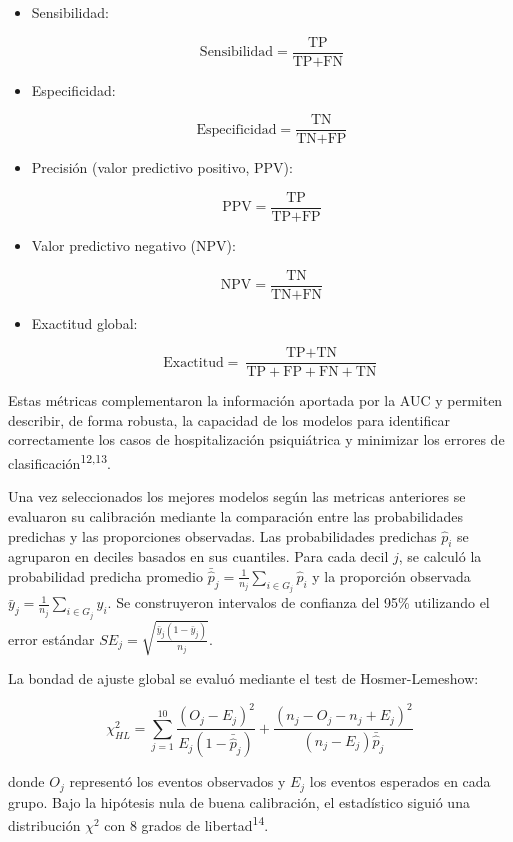 \documentclass[
  spanish,
  10pt,
]{article}
\begin{document}
\begin{itemize}
\item
  Sensibilidad:

  \[
  \text{Sensibilidad} = \frac{\text{TP}}{\text{TP}+\text{FN}}
  \]
\item
  Especificidad:

  \[
  \text{Especificidad} = \frac{\text{TN}}{\text{TN}+\text{FP}}
  \]
\item
  Precisión (valor predictivo positivo, PPV):

  \[
  \text{PPV} = \frac{\text{TP}}{\text{TP}+\text{FP}}
  \]
\item
  Valor predictivo negativo (NPV):

  \[
  \text{NPV} = \frac{\text{TN}}{\text{TN}+\text{FN}}
  \]
\item
  Exactitud global:

  \[
  \text{Exactitud} = \frac{\text{TP}+\text{TN}}{\text{TP}+\text{FP}+\text{FN}+\text{TN}}
  \]
\end{itemize}

Estas métricas complementaron la información aportada por la AUC y
permiten describir, de forma robusta, la capacidad de los modelos para
identificar correctamente los casos de hospitalización psiquiátrica y
minimizar los errores de clasificación\textsuperscript{12,13}.

Una vez seleccionados los mejores modelos según las metricas anteriores
se evaluaron su calibración mediante la comparación entre las
probabilidades predichas y las proporciones observadas. Las
probabilidades predichas \(\hat{p}_i\) se agruparon en deciles basados
en sus cuantiles. Para cada decil \(j\), se calculó la probabilidad
predicha promedio
\(\bar{\hat{p}}_j = \frac{1}{n_j}\sum_{i \in G_j} \hat{p}_i\) y la
proporción observada \(\bar{y}_j = \frac{1}{n_j}\sum_{i \in G_j} y_i\).
Se construyeron intervalos de confianza del 95\% utilizando el error
estándar \(SE_j = \sqrt{\frac{\bar{y}_j(1-\bar{y}_j)}{n_j}}\).

La bondad de ajuste global se evaluó mediante el test de
Hosmer-Lemeshow:

\[\chi^2_{HL} = \sum_{j=1}^{10} \frac{(O_j - E_j)^2}{E_j(1 - \bar{\hat{p}}_j)} + \frac{(n_j - O_j - n_j + E_j)^2}{(n_j - E_j)\bar{\hat{p}}_j}\]

donde \(O_j\) representó los eventos observados y \(E_j\) los eventos
esperados en cada grupo. Bajo la hipótesis nula de buena calibración, el
estadístico siguió una distribución \(\chi^2\) con 8 grados de
libertad\textsuperscript{14}.
\end{document}
